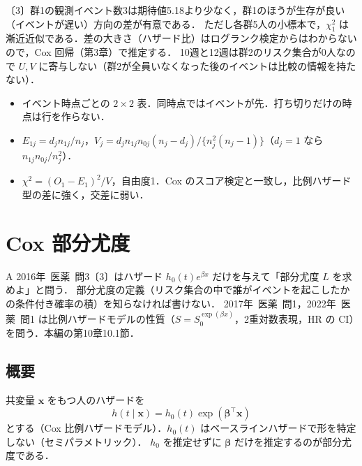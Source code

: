 \documentclass[a4paper,11pt,openany]{ltjsbook}
\newenvironment{kaitou}[1]{%
  \par\medskip\noindent
  \begin{tcolorbox}[enhanced,breakable,colback=bkgray!3,colframe=bkgray!60,boxrule=0.4pt,
    left=4pt,right=4pt,top=2pt,bottom=2pt,arc=1pt,
    title={\cref{#1}の解答},fonttitle=\bfseries\small,coltitle=white,colbacktitle=bkgray!80]}%
  {\end{tcolorbox}\par}
\newcommand{\kakomon}[2]{\mbox{#1年 医薬 問#2}}
\newcommand{\transp}{^{\top}}
\begin{document}
\begin{kaitou}{reidai:m02-1}
〔3〕群1の観測イベント数3は期待値5.18より少なく，群1のほうが生存が良い（イベントが遅い）方向の差が有意である．
ただし各群5人の小標本で，$\chi^2_1$ は漸近近似である．差の大きさ（ハザード比）はログランク検定からはわからないので，Cox 回帰（第3章）で推定する．
10週と12週は群2のリスク集合が0人なので $U,V$ に寄与しない（群2が全員いなくなった後のイベントは比較の情報を持たない）．
\end{kaitou}

\begin{summarybox}
\begin{itemize}
\item イベント時点ごとの $2\times2$ 表．同時点ではイベントが先．打ち切りだけの時点は行を作らない．
\item $E_{1j}=d_jn_{1j}/n_j$，$V_j=d_jn_{1j}n_{0j}(n_j-d_j)/\{n_j^2(n_j-1)\}$（$d_j=1$ なら $n_{1j}n_{0j}/n_j^2$）．
\item $\chi^2=(O_1-E_1)^2/V$，自由度1．Cox のスコア検定と一致し，比例ハザード型の差に強く，交差に弱い．
\end{itemize}
\end{summarybox}

\chapter{Cox 部分尤度}\label{ch:m03}

\begin{priobox}{A}
\kakomon{2016}{3}〔3〕はハザード $h_0(t)e^{\beta x}$ だけを与えて「部分尤度 $L$ を求めよ」と問う．
部分尤度の定義（リスク集合の中で誰がイベントを起こしたかの条件付き確率の積）を知らなければ書けない．
\kakomon{2017}{1}，\kakomon{2022}{1} は比例ハザードモデルの性質（$S=S_0^{\exp(\beta x)}$，2重対数表現，HR の CI）を問う．本編の第10章10.1節．
\end{priobox}

\section{概要}\label{sec:m03-gaiyo}
共変量 $\bm x$ をもつ人のハザードを
\[
h(t\mid\bm x)=h_0(t)\exp(\bm\beta\transp\bm x)
\]
とする（Cox 比例ハザードモデル）．$h_0(t)$ はベースラインハザードで形を特定しない（セミパラメトリック）．
$h_0$ を推定せずに $\bm\beta$ だけを推定するのが部分尤度である．
\end{document}
